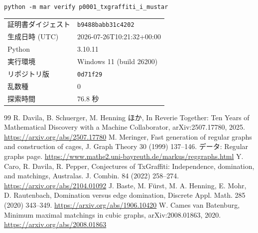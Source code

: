 \documentclass[paper=a4,fontsize=10.5pt,jafontsize=10.5pt]{jlreq}
\theoremstyle{plain}
\theoremstyle{definition}
\begin{document}
\begin{center}\texttt{python -m mar verify p0001\_txgraffiti\_i\_mustar}\end{center}

\begin{center}\begin{tabular}{ll}\toprule
証明書ダイジェスト & \texttt{b9488babb31c4202} \\
生成日時 (UTC) & 2026-07-26T10:21:32+00:00 \\
Python & 3.10.11 \\
実行環境 & Windows 11 (build 26200) \\
リポジトリ版 & \texttt{0d71f29} \\
乱数種 & 0 \\
探索時間 & 76.8 秒 \\
\bottomrule\end{tabular}\end{center}


\begin{thebibliography}{99}
 R. Davila, B. Schuerger, M. Henning ほか, In Reverie Together: Ten Years of Mathematical Discovery with a Machine Collaborator, arXiv:2507.17780, 2025. \url{https://arxiv.org/abs/2507.17780}
 M. Meringer, Fast generation of regular graphs and construction of cages, J. Graph Theory 30 (1999) 137--146. データ: Regular graphs page. \url{https://www.mathe2.uni-bayreuth.de/markus/reggraphs.html}
 Y. Caro, R. Davila, R. Pepper, Conjectures of TxGraffiti: Independence, domination, and matchings, Australas. J. Combin. 84 (2022) 258--274. \url{https://arxiv.org/abs/2104.01092}
 J. Baste, M. Fürst, M. A. Henning, E. Mohr, D. Rautenbach, Domination versus edge domination, Discrete Appl. Math. 285 (2020) 343--349. \url{https://arxiv.org/abs/1906.10420}
 W. Cames van Batenburg, Minimum maximal matchings in cubic graphs, arXiv:2008.01863, 2020. \url{https://arxiv.org/abs/2008.01863}
\end{thebibliography}
\end{document}
